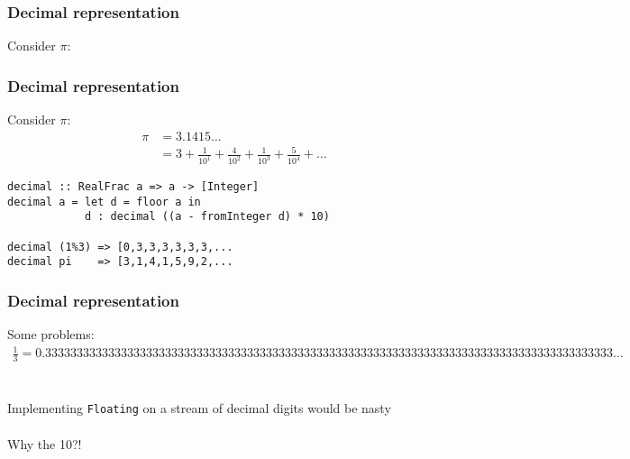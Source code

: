 \documentclass[11pt,aspectratio=169]{beamer}
\begin{document}
\begin{frame}
\frametitle{Decimal representation}
Consider $\pi$:
\end{frame}

\begin{frame}[fragile]
\frametitle{Decimal representation}
Consider $\pi$:
\begin{align*}
\pi &= 3.1415\dots \\
&= 3 + \frac{1}{10^1} + \frac{4}{10^2} + \frac{1}{10^3} + \frac{5}{10^4} + \dots
\end{align*}

\begin{verbatim}
decimal :: RealFrac a => a -> [Integer]
decimal a = let d = floor a in
            d : decimal ((a - fromInteger d) * 10)

decimal (1%3) => [0,3,3,3,3,3,3,...
decimal pi    => [3,1,4,1,5,9,2,...
\end{verbatim}
\end{frame}

\begin{frame}
\frametitle{Decimal representation}
Some problems:
\begin{align*}
\frac{1}{3} = 0.333333333333333333333333333333333333333333333333333333333333333333333333333333333333333333\dots
\end{align*}
\\~\\
Implementing \texttt{Floating} on a stream of decimal digits
would be nasty
\\~\\
Why the 10?!
\end{frame}
\end{document}

